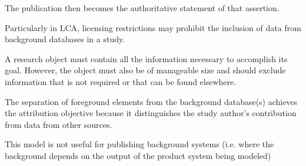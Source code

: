 The publication then becomes the authoritative statement of that assertion.

Particularly in LCA, licensing restrictions may prohibit the inclusion of data from background databases in a study.

A research object must contain all the information necessary to accomplish its goal.  However, the object must also be of manageable size and should exclude information that is not required or that can be found elsewhere.

The separation of foreground elements from the background database(s) achieves the attribution objective because it distinguishes the study author's contribution from data from other sources.

This model is not useful for publishing background systems (i.e. where the background depends on the output of the product system being modeled)

